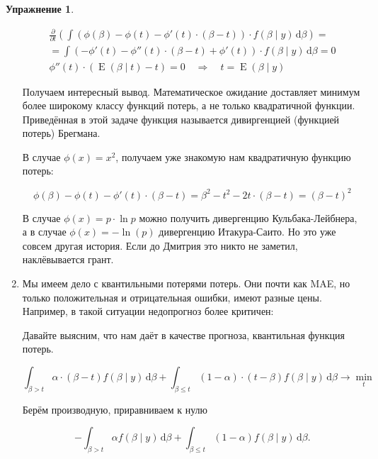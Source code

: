 \documentclass[12pt, a4paper, oneside]{extreport}
\DeclareMathOperator{\E}{\mathop{E}}
\def \a{\alpha}
\def \b{\beta}
\newcommand{\dx}[1]{\,\mathrm{d}#1} %
\theoremstyle{plain}              %
\theoremstyle{definition}         %
\newtheorem{problem}{\color{myblue} Упражнение}
\begin{document}
\begin{problem}
\begin{sol}
\begin{enumerate}
\begin{multline*}
\frac{\partial }{\partial t} \left(  \int (\phi(\beta) - \phi(t) - \phi'(t) \cdot(\b - t)) \cdot  f(\beta \mid y) \dx{\beta}   \right) = \\ =  \int (-\phi'(t) - \phi''(t)\cdot(\b - t) + \phi'(t)) \cdot f(\b \mid y) \dx{\b} = 0  \\ 
\phi''(t)\cdot(\E(\b \mid t) - t) = 0  \quad \Rightarrow \quad t = \E(\beta \mid y)  
\end{multline*} 

Получаем интересный вывод. Математическое ожидание доставляет минимум более широкому классу функций потерь, а не только квадратичной функции. Приведённая в этой задаче функция называется дивиргенцией (функцией потерь) Брегмана.

В случае $\phi(x) = x^2$, получаем уже знакомую нам квадратичную функцию потерь: 

\[ \phi(\b) - \phi(t) - \phi'(t)\cdot(\b-t) = \b^2 - t^2 - 2t \cdot (\b-t) =  (\b-t)^2    \] 

В случае $\phi(x) = p \cdot \ln p$ можно получить дивергенцию Кульбака-Лейбнера, а в случае $\phi(x) = - \ln(p)$ дивергенцию Итакура-Саито. Но это уже совсем другая история.  Если до Дмитрия это никто не заметил, наклёвывается грант. 

\item Мы имеем дело с квантильными потерями потерь. Они почти как MAE, но только положительная и отрицательная ошибки, имеют разные цены.  Например, в такой ситуации недопрогноз более критичен: 

\begin{center}
\end{center} 

Давайте выясним, что нам даёт в качестве прогноза, квантильная функция потерь. 

\[ \int_{\b > t} \alpha \cdot (\b - t) f(\b \mid y) \dx{\beta} + \int_{\b \le t} (1 - \alpha) \cdot (t - \b) f(\b \mid y) \dx{\b} \to \min_t \]

Берём производную, приравниваем к нулю

\[ -\int_{\b > t} \alpha f(\b \mid y) \dx{\beta}  + \int_{\b \le t} (1- \a) f(\b \mid y) \dx{\beta}. \] 


\end{enumerate}
\end{sol}
\end{problem}
\end{document}

